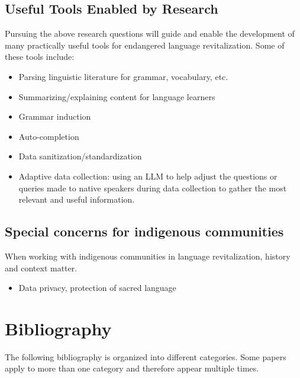 \documentclass{article}
\begin{document}
\subsection*{Useful Tools Enabled by Research}
Pursuing the above research questions will guide and enable the development of many practically useful tools for endangered language revitalization.
Some of these tools include:
\begin{itemize}
    \item Parsing linguistic literature for grammar, vocabulary, etc.
    \item Summarizing/explaining content for language learners
    \item Grammar induction
    \item Auto-completion
    \item Data sanitization/standardization
    \item Adaptive data collection: using an LLM to help adjust the questions or queries made to native speakers during data collection to gather the most relevant and useful information.
\end{itemize}

\subsection*{Special concerns for indigenous communities}
When working with indigenous communities in language revitalization, history and context matter.
\begin{itemize}
    \item Data privacy, protection of sacred language
\end{itemize}

\newpage
\section*{Bibliography}
The following bibliography is organized into different categories.
Some papers apply to more than one category and therefore appear multiple times.

\nocite{*}
\printbibliography[
    heading=bibsection,
    keyword={our-work},
    title={Our Work}
]
\printbibliography[
    heading=bibsection,
    keyword={llm},
    title={Work on LLMs (Large Language Models)}
]
\printbibliography[
    heading=bibsection,
    keyword={low-resource},
    title={Work on Low-Resource Languages}
]
\printbibliography[
    heading=bibsection,
    keyword={rbmt},
    title={Work on RBMT (Rule-Based Machine Translation)}
]
\printbibliography[
    heading=bibsection,
    keyword={rag},
    title={Work on RAG (Retrieval Augmented Generation)}
]
\printbibliography[
    heading=bibsection,
    keyword={embeddings},
    title={Work on Embeddings \& Semantic Similarity}
]
\printbibliography[
    heading=bibsection,
    keyword={linguistic-probing},
    title={Work on Linguistic Probing}
]

\printbibliography[
    heading=bibsection,
    keyword={embeddings-models},
    title={Embeddings Models}
]
\printbibliography[
    heading=bibsection,
    keyword={other},
    title={Other References}
]
\end{document}
